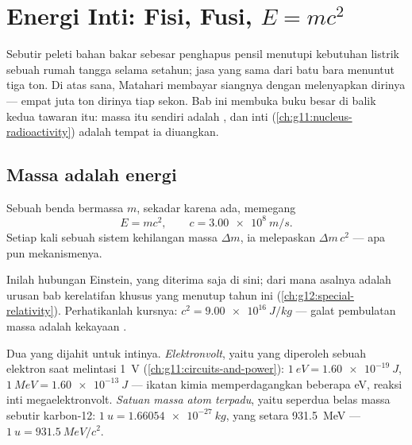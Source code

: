 \chapter{Energi Inti: Fisi, Fusi, $E=mc^2$}\label{ch:g12:nuclear-energy}

Sebutir peleti bahan bakar sebesar penghapus pensil menutupi kebutuhan listrik
sebuah rumah tangga selama setahun; jasa yang sama dari batu bara menuntut tiga ton.
Di atas sana, Matahari membayar siangnya dengan melenyapkan dirinya --- empat juta ton
dirinya tiap sekon. Bab ini membuka buku besar di balik kedua tawaran itu: massa itu
sendiri adalah , dan inti (\cref{ch:g11:nucleus-radioactivity}) adalah tempat ia diuangkan.

\section{Massa adalah energi}

\begin{theorem}\label{thm:g12:nuclear-energy:emc2}
Sebuah benda bermassa $m$, sekadar karena ada, memegang 
\[
E = m c^2, \qquad c = \qty{3.00e8}{m/s}.
\]
Setiap kali sebuah sistem kehilangan massa $\Delta m$, ia melepaskan 
$\Delta m\, c^2$ --- apa pun mekanismenya.
\end{theorem}
\admitted

\begin{remark}[Einstein, 1905]\label{rem:g12:nuclear-energy:einstein}
Inilah hubungan Einstein, yang diterima saja di sini; dari mana asalnya adalah urusan
bab kerelatifan khusus yang menutup tahun ini
(\cref{ch:g12:special-relativity}). Perhatikanlah kursnya: $c^2 = \qty{9.00e16}{J/kg}$
--- galat pembulatan massa adalah kekayaan .
\end{remark}

\begin{definition}\label{def:g12:nuclear-energy:units}
Dua  yang dijahit untuk intinya.
\emph{Elektronvolt}, yaitu  yang diperoleh sebuah elektron
saat melintasi \qty{1}{V} (\cref{ch:g11:circuits-and-power}):
$\qty{1}{eV} = \qty{1.60e-19}{J}$, $\qty{1}{MeV} = \qty{1.60e-13}{J}$ ---
ikatan kimia memperdagangkan beberapa \unit{eV}, reaksi inti megaelektronvolt.
\emph{Satuan massa atom terpadu}, yaitu
seperdua belas massa sebutir  karbon-12: $\qty{1}{u} = \qty{1.66054e-27}{kg}$,
yang setara  \qty{931.5}{MeV} --- $\qty{1}{u} = \qty{931.5}{MeV}/c^2$.
\end{definition}

